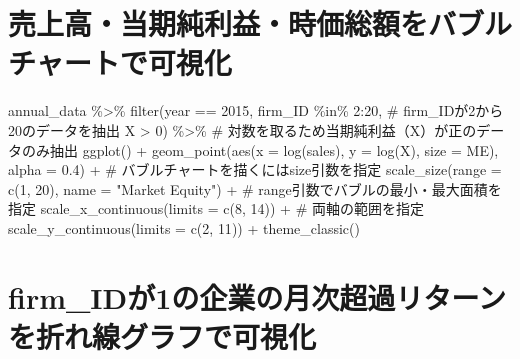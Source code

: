 \documentclass[
  letterpaper,
  DIV=11,
  numbers=noendperiod]{scrreprt}
\newenvironment{Shaded}{\begin{snugshade}}{\end{snugshade}}
\newcommand{\AttributeTok}[1]{\textcolor[rgb]{0.40,0.45,0.13}{#1}}
\newcommand{\CommentTok}[1]{\textcolor[rgb]{0.37,0.37,0.37}{#1}}
\newcommand{\DecValTok}[1]{\textcolor[rgb]{0.68,0.00,0.00}{#1}}
\newcommand{\FloatTok}[1]{\textcolor[rgb]{0.68,0.00,0.00}{#1}}
\newcommand{\FunctionTok}[1]{\textcolor[rgb]{0.28,0.35,0.67}{#1}}
\newcommand{\NormalTok}[1]{\textcolor[rgb]{0.00,0.23,0.31}{#1}}
\newcommand{\SpecialCharTok}[1]{\textcolor[rgb]{0.37,0.37,0.37}{#1}}
\newcommand{\StringTok}[1]{\textcolor[rgb]{0.13,0.47,0.30}{#1}}
\begin{document}
\section{売上高・当期純利益・時価総額をバブルチャートで可視化}\label{ux58f2ux4e0aux9ad8ux5f53ux671fux7d14ux5229ux76caux6642ux4fa1ux7dcfux984dux3092ux30d0ux30d6ux30ebux30c1ux30e3ux30fcux30c8ux3067ux53efux8996ux5316}

\begin{Shaded}
\begin{Highlighting}[]
\NormalTok{annual\_data }\SpecialCharTok{\%\textgreater{}\%} 
  \FunctionTok{filter}\NormalTok{(year }\SpecialCharTok{==} \DecValTok{2015}\NormalTok{,}
\NormalTok{         firm\_ID }\SpecialCharTok{\%in\%} \DecValTok{2}\SpecialCharTok{:}\DecValTok{20}\NormalTok{, }\CommentTok{\# firm\_IDが2から20のデータを抽出}
\NormalTok{         X }\SpecialCharTok{\textgreater{}} \DecValTok{0}\NormalTok{) }\SpecialCharTok{\%\textgreater{}\%} \CommentTok{\# 対数を取るため当期純利益（X）が正のデータのみ抽出}
  \FunctionTok{ggplot}\NormalTok{() }\SpecialCharTok{+} 
  \FunctionTok{geom\_point}\NormalTok{(}\FunctionTok{aes}\NormalTok{(}\AttributeTok{x =} \FunctionTok{log}\NormalTok{(sales), }\AttributeTok{y =} \FunctionTok{log}\NormalTok{(X), }\AttributeTok{size =}\NormalTok{ ME), }\AttributeTok{alpha =} \FloatTok{0.4}\NormalTok{) }\SpecialCharTok{+} \CommentTok{\# バブルチャートを描くにはsize引数を指定}
  \FunctionTok{scale\_size}\NormalTok{(}\AttributeTok{range =} \FunctionTok{c}\NormalTok{(}\DecValTok{1}\NormalTok{, }\DecValTok{20}\NormalTok{), }\AttributeTok{name =} \StringTok{"Market Equity"}\NormalTok{) }\SpecialCharTok{+} \CommentTok{\# range引数でバブルの最小・最大面積を指定}
  \FunctionTok{scale\_x\_continuous}\NormalTok{(}\AttributeTok{limits =} \FunctionTok{c}\NormalTok{(}\DecValTok{8}\NormalTok{, }\DecValTok{14}\NormalTok{)) }\SpecialCharTok{+} \CommentTok{\# 両軸の範囲を指定}
  \FunctionTok{scale\_y\_continuous}\NormalTok{(}\AttributeTok{limits =} \FunctionTok{c}\NormalTok{(}\DecValTok{2}\NormalTok{, }\DecValTok{11}\NormalTok{)) }\SpecialCharTok{+}
  \FunctionTok{theme\_classic}\NormalTok{()}
\end{Highlighting}
\end{Shaded}

\section{firm\_IDが1の企業の月次超過リターンを折れ線グラフで可視化}\label{firm_idux304c1ux306eux4f01ux696dux306eux6708ux6b21ux8d85ux904eux30eaux30bfux30fcux30f3ux3092ux6298ux308cux7ddaux30b0ux30e9ux30d5ux3067ux53efux8996ux5316}
\end{document}
